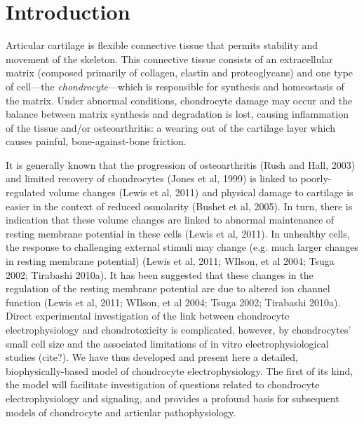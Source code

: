 \section{Introduction}
\label{introduction}

Articular cartilage is flexible connective tissue that permits
stability and movement of the skeleton.  This connective tissue
consists of an extracellular matrix (composed primarily of collagen,
elastin and proteoglycans) and one type of cell---the {\em
chondrocyte}---which is responsible for synthesis and homeostasis of
the matrix.  Under abnormal conditions, chondrocyte damage may occur
and the balance between matrix synthesis and degradation is lost,
causing inflammation of the tissue and/or osteoarthritis: a wearing
out of the cartilage layer which causes painful, bone-against-bone
friction.

It is generally known that the progression of osteoarthritis (Rush and
Hall, 2003) and limited recovery of chondrocytes (Jones et al, 1999)
is linked to poorly-regulated volume changes (Lewis et al, 2011) and
physical damage to cartilage is easier in the context of reduced
osmolarity (Bushet et al, 2005).  In turn, there is indication that
these volume changes are linked to abnormal maintenance of resting
membrane potential in these cells (Lewis et al, 2011).  In unhealthy
cells, the response to challenging external stimuli may change
(e.g. much larger changes in resting membrane potential) (Lewis et al,
2011; WIlson, et al 2004; Tsuga 2002; Tirabashi 2010a).  It has been
suggested that these changes in the regulation of the resting membrane
potential are due to altered ion channel function (Lewis et al, 2011;
WIlson, et al 2004; Tsuga 2002; Tirabashi 2010a).  Direct experimental
investigation of the link between chondrocyte electrophysiology and
chondrotoxicity is complicated, however, by chondrocytes' small cell
size and the associated limitations of in vitro electrophysiological
studies (cite?).  We have thus developed and present here a detailed,
biophysically-based model of chondrocyte electrophysiology.  The first
of its kind, the model will facilitate investigation of questions
related to chondrocyte electrophysiology and signaling, and provides a
profound basis for subsequent models of chondrocyte and articular
pathophysiology.

